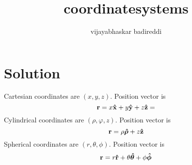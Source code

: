 \documentclass[12pt]{article}
\title{coordinatesystems}
\author{vijayabhaskar badireddi}
\date{}
\begin{document}

\section*{Solution}
Cartesian coordinates are $(x,y,z)$. Position vector is \[\vb{r}=x\vu{x}+y\vu{y}+z\vu{z}=\]
Cylindrical coordinates are $(\rho,\varphi,z)$. Position vector is \[\vb{r}=\rho\vu{\bm{\rho}}+z\vu{z}\]
Spherical coordinates are $(r,\theta,\phi)$. Position vector is 
\[\vb{r}=r\vu{r}+\theta\vu{\bm{\theta}}+\phi\vu{\bm{\phi}}\]
\end{document}
